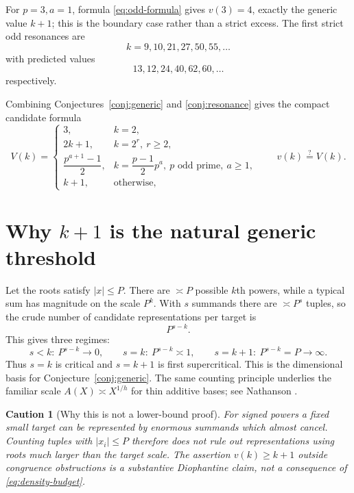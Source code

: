 \documentclass[../Axiomathic.tex]{subfiles}
\newtheorem{warning}[theorem]{Caution}
\begin{document}
For $p=3,a=1$, formula \eqref{eq:odd-formula} gives $v(3)=4$, exactly the generic value $k+1$; this is the boundary case rather than a strict excess.  The first strict odd resonances are
\[
  k=9,10,21,27,50,55,\ldots
\]
with predicted values
\[
  13,12,24,40,62,60,\ldots
\]
respectively.

Combining Conjectures~\ref{conj:generic} and \ref{conj:resonance} gives the compact candidate formula
\begin{equation}\label{eq:candidate-formula}
V(k)=
\begin{cases}
3,&k=2,\\
2k+1,&k=2^r,\ r\ge2,\\[1mm]
\dfrac{p^{a+1}-1}{2},&k=\dfrac{p-1}{2}p^a,\ p\text{ odd prime},\ a\ge1,\\[2mm]
k+1,&\text{otherwise},
\end{cases}
\qquad
\boxed{v(k)\stackrel?=V(k).}
\end{equation}

\section{Why $k+1$ is the natural generic threshold}

Let the roots satisfy $|x|\le P$.  There are $\asymp P$ possible $k$th powers, while a typical sum has magnitude on the scale $P^k$.  With $s$ summands there are $\asymp P^s$ tuples, so the crude number of candidate representations per target is
\begin{equation}\label{eq:density-budget}
  \boxed{P^{s-k}.}
\end{equation}
This gives three regimes:
\[
  s<k:\ P^{s-k}\to0,
  \qquad
  s=k:\ P^{s-k}\asymp1,
  \qquad
  s=k+1:\ P^{s-k}=P\to\infty.
\]
Thus $s=k$ is critical and $s=k+1$ is first supercritical.  This is the dimensional basis for Conjecture~\ref{conj:generic}.  The same counting principle underlies the familiar scale $A(X)\asymp X^{1/h}$ for thin additive bases; see Nathanson \cite{Nathanson1996}.

\begin{warning}[Why this is not a lower-bound proof]
For signed powers a fixed small target can be represented by enormous summands which almost cancel.  Counting tuples with $|x_i|\le P$ therefore does not rule out representations using roots much larger than the target scale.  The assertion $v(k)\ge k+1$ outside congruence obstructions is a substantive Diophantine claim, not a consequence of \eqref{eq:density-budget}.
\end{warning}
\end{document}

